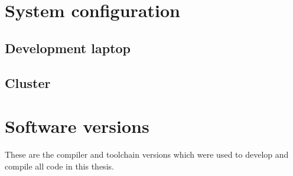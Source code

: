 \glsaddall
\printglossaries

\chapter{System configuration}
\label{ap:Configuration}

\section*{Development laptop}
\label{ap:Configuration::Laptop}





\section*{Cluster}
\label{ap:Configuration::Cluster}





\chapter{Software versions}
\label{ap:Versions}

These are the compiler and toolchain versions which were used to develop and compile all code in this thesis.
\\ \\








